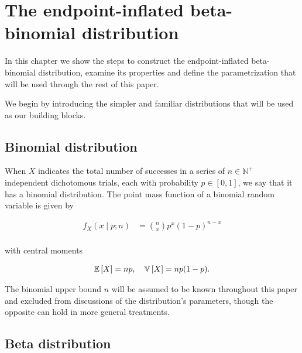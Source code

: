 \chapter{The endpoint-inflated beta-binomial distribution}
\label{cap:distribution}

In this chapter we show the steps to construct the endpoint-inflated beta-binomial distribution, examine its properties and define the parametrization that will be used through the rest of this paper.

We begin by introducing the simpler and familiar distributions that will be used as our building blocks.

\section{Binomial distribution}
\label{sec:bino-dist}

When $X$ indicates the total number of successes in a series of $n \in \mathbb{N}^+$ independent dichotomous trials, each with probability $p \in [0,1]$, we say that it has a binomial distribution. The point mass function of a binomial random variable is given by

\begin{equation}
\label{binomial-pmf}
\begin{split}
f_{X}(x \mid p; n)
&= \binom{n}{x}p^x(1-p)^{n-x}\\
\end{split}
\end{equation}

with central moments

\begin{equation}
\label{binomial-moments}
\begin{split}
{\mathbb E}\left[ X \right] = np, \quad {\mathbb V}\left[ X \right] = np(1-p).
\end{split}
\end{equation}

The binomial upper bound $n$ will be assumed to be known throughout this paper and excluded from discussions of the distribution's parameters, though the opposite can hold in more general treatments.

\section{Beta distribution}
\label{sec:beta-dist}

